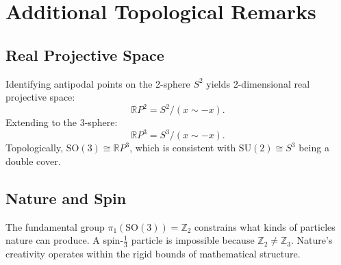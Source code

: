 \documentclass[11pt,a4paper]{article}
\theoremstyle{definition}
\theoremstyle{plain}
\theoremstyle{remark}
\begin{document}
\section{Additional Topological Remarks}

\subsection{Real Projective Space}

Identifying antipodal points on the 2-sphere $S^2$ yields 2-dimensional real projective space:
\[
    \mathbb{R}P^2 = S^2 / (x \sim -x).
\]
Extending to the 3-sphere:
\[
    \mathbb{R}P^3 = S^3 / (x \sim -x).
\]
Topologically, $\mathrm{SO}(3) \cong \mathbb{R}P^3$, which is consistent with $\mathrm{SU}(2) \cong S^3$ being a double cover.

\subsection{Nature and Spin}

The fundamental group $\pi_1(\mathrm{SO}(3)) = \mathbb{Z}_2$ constrains what kinds of particles nature can produce. A spin-$\frac{1}{3}$ particle is impossible because $\mathbb{Z}_2 \neq \mathbb{Z}_3$. Nature's creativity operates within the rigid bounds of mathematical structure.
\end{document}
